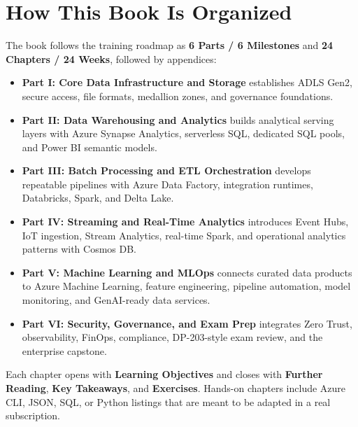 \section*{How This Book Is Organized}
The book follows the training roadmap as \textbf{6 Parts / 6 Milestones} and \textbf{24 Chapters / 24 Weeks}, followed by appendices:
\begin{itemize}
    \item \textbf{Part I: Core Data Infrastructure and Storage} establishes ADLS Gen2, secure access, file formats, medallion zones, and governance foundations.
    \item \textbf{Part II: Data Warehousing and Analytics} builds analytical serving layers with Azure Synapse Analytics, serverless SQL, dedicated SQL pools, and Power BI semantic models.
    \item \textbf{Part III: Batch Processing and ETL Orchestration} develops repeatable pipelines with Azure Data Factory, integration runtimes, Databricks, Spark, and Delta Lake.
    \item \textbf{Part IV: Streaming and Real-Time Analytics} introduces Event Hubs, IoT ingestion, Stream Analytics, real-time Spark, and operational analytics patterns with Cosmos DB.
    \item \textbf{Part V: Machine Learning and MLOps} connects curated data products to Azure Machine Learning, feature engineering, pipeline automation, model monitoring, and GenAI-ready data services.
    \item \textbf{Part VI: Security, Governance, and Exam Prep} integrates Zero Trust, observability, FinOps, compliance, DP-203-style exam review, and the enterprise capstone.
\end{itemize}
Each chapter opens with \textbf{Learning Objectives} and closes with \textbf{Further Reading}, \textbf{Key Takeaways}, and \textbf{Exercises}. Hands-on chapters include Azure CLI, JSON, SQL, or Python listings that are meant to be adapted in a real subscription.


